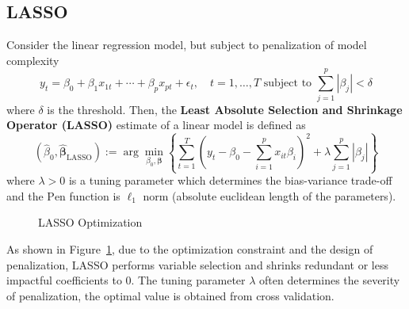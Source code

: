 \documentclass[oneside, 12pt]{article}
\newcommand*{\1}{\text{\scalebox{1.1}{\usefont{U}{bbold}{m}{n}1}}}
\begin{document}
\subsection{LASSO}
Consider the linear regression model, but subject to penalization of model complexity
$$
y_t = \beta_0 + \beta_1 x_{1t} + \cdots + \beta_p x_{pt} + \epsilon_t, \quad t = 1, \hdots, T \text{ subject to } \sum_{j = 1}^p |\beta_j| < \delta
$$
where $\delta$ is the threshold. Then, the \textbf{Least Absolute Selection and Shrinkage Operator (LASSO)} estimate of a linear model is defined as 
$$
(\hat{\beta}_0, \hat{\boldsymbol\beta}_{\text{LASSO}}) := \arg\min_{\beta_0, \boldsymbol\beta} \left\{\sum_{t=1}^T \left(y_t - \beta_0 - \sum_{i = 1}^p x_{it}\beta_i \right)^2 + \lambda \sum_{j = 1}^p |\beta_j|\right\}
$$
where $\lambda > 0$ is a tuning parameter which determines the bias-variance trade-off and the $\mathrm{Pen}$ function is $\ell_1$ norm (absolute euclidean length of the parameters). 


\begin{figure}[h]
\centering
{}
\caption{LASSO Optimization}
\label{fig:lasso_opt}
\end{figure}

As shown in Figure~\ref{fig:lasso_opt}, due to the optimization constraint and the design of penalization, LASSO performs variable selection and shrinks redundant or less impactful coefficients to 0. The tuning parameter $\lambda$ often determines the severity of penalization, the optimal value is obtained from cross validation. 
\end{document}
